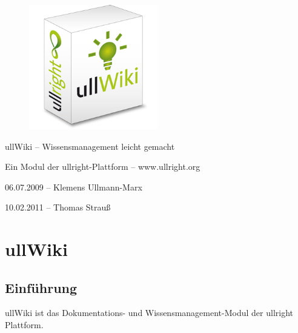 \documentclass[article, a4paper, oneside, 11pt]{memoir}
\begin{document}
\vspace*{3cm}
\begin{figure}[htp]
\centering
\includegraphics[width=0.5\textwidth]{softwarebox}
\end{figure}

\vspace{3cm}

{%
\huge
\color{ullblue}
ullWiki – Wissensmanagement leicht gemacht
}

\vspace{0.2cm}

{%
\large
Ein Modul der ullright-Plattform -- www.ullright.org
}

\vspace{1cm}

{%
\footnotesize
06.07.2009 -- Klemens Ullmann-Marx

10.02.2011 -- Thomas Strauß
}

\clearpage

\pagestyle{plain}


\setcounter{secnumdepth}{2}
\setcounter{tocdepth}{2}
\tableofcontents*

\clearpage

\addtocounter{chapter}{1}

\chapter*{ullWiki}

\section{Einführung}
ullWiki ist das Dokumentations- und Wissensmanagement-Modul der ullright Plattform.
\end{document}
